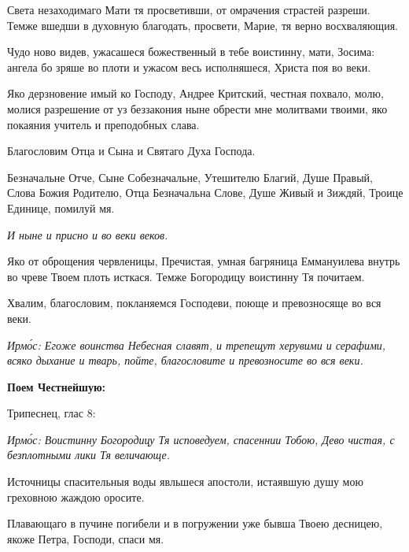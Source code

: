 
Света незаходимаго Мати тя просветивши, от омрачения страстей разреши. Темже вшедши в духовную благодать, просвети, Марие, тя верно восхваляющия.


Чудо ново видев, ужасашеся божественный в тебе воистинну, мати, Зосима: ангела бо зряше во плоти и ужасом весь исполняшеся, Христа поя во веки.


Яко дерзновение имый ко Господу, Андрее Критский, честная похвало, молю, молися разрешение от уз беззакония ныне обрести мне молитвами твоими, яко покаяния учитель и преподобных слава.

Благословим Отца и Сына и Святаго Духа Господа.

Безначальне Отче, Сыне Собезначальне, Утешителю Благий, Душе Правый, Слова Божия Родителю, Отца Безначальна Слове, Душе Живый и Зиждяй, Троице Единице, помилуй мя.

\itshape И ныне\normalfont{} и присно и во веки веков.

Яко от оброщения червленицы, Пречистая, умная багряница Еммануилева внутрь во чреве Твоем плоть исткася. Темже Богородицу воистинну Тя почитаем.

Хвалим, благословим, покланяемся Господеви, поюще и превозносяще во вся веки.

\itshape Ирм\'{о}с\normalfont{}: Егоже воинства Небесная славят, и трепещут херувими и серафими, всяко дыхание и тварь, пойте, благословите и превозносите во вся веки. 

\medskip\bfseries Поем Честнейшую:

Трипеснец, глас 8:\normalfont{}


\itshape Ирм\'{о}с\normalfont{}: Воистинну Богородицу Тя исповедуем, спасеннии Тобою, Дево чистая, с безплотными лики Тя величающе.


Источницы спасительныя воды явльшеся апостоли, истаявшую душу мою греховною жаждою оросите.


Плавающаго в пучине погибели и в погружении уже бывша Твоею десницею, якоже Петра, Господи, спаси мя.

